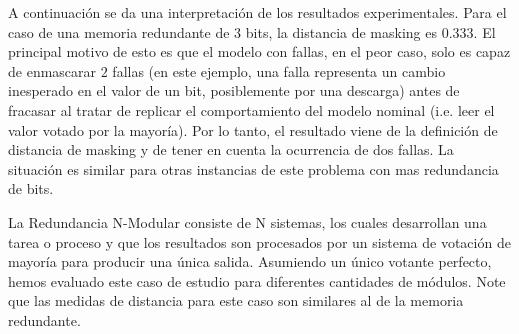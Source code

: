 A continuación se da una interpretación de los resultados experimentales. Para el caso de una memoria redundante de $3$ bits, la distancia de masking es $0.333$. El principal motivo de esto es que el modelo con fallas, en el peor caso, solo es capaz de enmascarar $2$ fallas (en este ejemplo, una falla representa un cambio inesperado en el valor de un bit, posiblemente por una descarga) antes de fracasar al tratar de replicar el comportamiento del modelo nominal (i.e. leer el valor votado por la mayoría). Por lo tanto, el resultado viene de la definición de distancia de masking y de tener en cuenta la ocurrencia de dos fallas. La situación es similar para otras instancias de este problema con mas redundancia de bits.

La Redundancia N-Modular consiste de N sistemas, los cuales desarrollan una tarea o proceso y que los resultados son procesados por un sistema de votación de mayoría para producir una única salida. 
Asumiendo un único votante perfecto, hemos evaluado este caso de estudio para diferentes cantidades de módulos.
Note que las medidas de distancia para este caso son similares al de la memoria redundante. 

